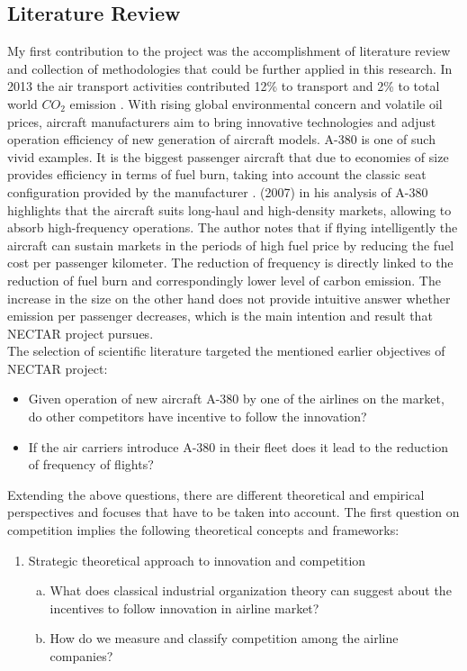 \documentclass[titlepage, 11pt]{article}
\begin{document}
\subsection{Literature Review} \label{literature review}
\tab My first contribution to the project was the accomplishment of literature review and collection of methodologies that could be further applied in this research. In 2013 the air transport activities contributed 12\% to transport and 2\% to total world $CO_2$ emission \cite{Emer1}. With rising global environmental concern and volatile oil prices, aircraft manufacturers aim to bring innovative technologies and adjust operation efficiency  of new generation of aircraft models. A-380 is one of such vivid examples. It is the biggest passenger aircraft that due to economies of size provides efficiency in terms of fuel burn, taking into account the classic seat configuration provided by the manufacturer \cite{King}. \citeauthor{King} (2007) \cite{King} in his analysis of A-380 highlights that the aircraft suits long-haul and high-density markets, allowing to absorb high-frequency operations. The author notes that if flying intelligently the aircraft can sustain markets in the periods of high fuel price by reducing the fuel cost per passenger kilometer. The reduction of frequency is directly linked to the reduction of fuel burn and correspondingly lower level of carbon emission. The increase in the size on the other hand does not provide intuitive answer whether emission per passenger decreases, which is the main intention and result that NECTAR project pursues. 
\\  The selection of scientific literature targeted the mentioned earlier objectives of NECTAR project: 
\begin{itemize}
\item Given operation of new aircraft A-380 by one of the airlines on the market, do other competitors have incentive to follow the innovation?   
\item If the air carriers introduce A-380 in their fleet does it lead to the reduction of frequency of flights? 
\end{itemize}
\tab Extending the above questions, there are different theoretical and empirical perspectives and focuses that have to be taken into account. The first question on competition implies the following theoretical concepts and frameworks:  
\begin{enumerate}
\item Strategic theoretical approach to innovation and competition
\begin{enumerate}[a)]
\item What does classical industrial organization theory can suggest about the incentives to follow innovation in airline market? 
\item How do we measure and classify competition among the airline companies? 
\end{enumerate}
\end{enumerate}
\end{document}
